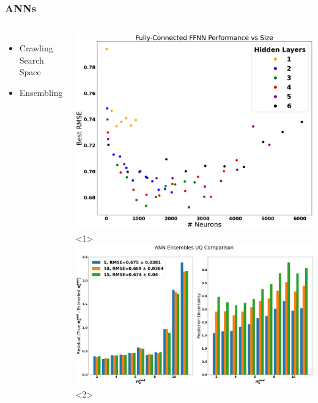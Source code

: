 \documentclass{beamer}
\begin{document}
\begin{frame}
\frametitle{ANNs}
\begin{columns}
\begin{itemize}
	\item<1-> Crawling Search Space
	\item<2-> Ensembling  
\end{itemize}
\includegraphics[scale=0.2]{../src/ANN_performace_size}<1>
\includegraphics[scale=0.135]{../src/ANN_ensemble_comp}<2>

\end{columns}

\end{frame}
\end{document}
